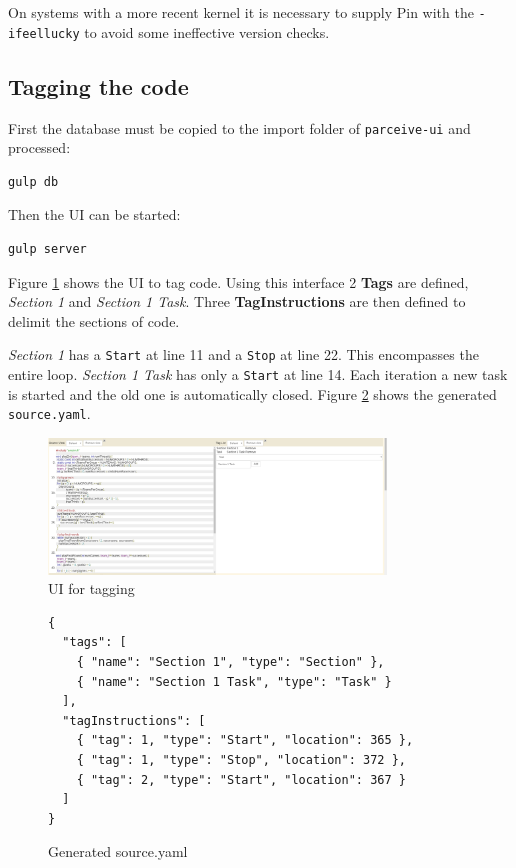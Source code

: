 On systems with a more recent kernel it is necessary to supply Pin with the \texttt{-ifeellucky} to avoid some ineffective version checks.

\subsection {Tagging the code}

First the database must be copied to the import folder of \texttt{parceive-ui} and processed:

\begin{lstlisting}[style=BashInputStyle]
gulp db
\end{lstlisting}

Then the UI can be started:

\begin{lstlisting}[style=BashInputStyle]
gulp server
\end{lstlisting}

Figure \ref{cap1:tagview} shows the UI to tag code. Using this interface 2 \textbf{Tags} are defined, \textit{Section 1} and \textit{Section 1 Task}. Three \textbf{TagInstructions} are then defined to delimit the sections of code.

\textit{Section 1} has a \texttt{Start} at line 11 and a \texttt{Stop} at line 22. This encompasses the entire loop.  \textit{Section 1 Task} has only a \texttt{Start} at line 14. Each iteration a new task is started and the old one is automatically closed. Figure \ref{cap1:source} shows the generated \texttt{source.yaml}.

\begin{figure}[!ht]
	\centering
	\includegraphics[width=0.8\textwidth]{tagging-view}
	\caption{UI for tagging}
	\label{cap1:tagview}
\end{figure}

\begin{figure}
	\begin{center}
		\begin{verbatim}
{
  "tags": [
    { "name": "Section 1", "type": "Section" },
    { "name": "Section 1 Task", "type": "Task" }
  ],
  "tagInstructions": [
    { "tag": 1, "type": "Start", "location": 365 },
    { "tag": 1, "type": "Stop", "location": 372 },
    { "tag": 2, "type": "Start", "location": 367 }
  ]
}
		\end{verbatim}
	\end{center}
	\caption{Generated source.yaml}
	\label{cap1:source}
\end{figure}

